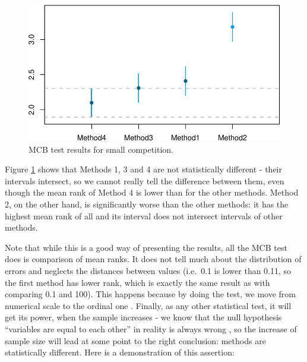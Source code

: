 \documentclass[
]{book}
\theoremstyle{definition}
\theoremstyle{definition}
\theoremstyle{definition}
\theoremstyle{definition}
\theoremstyle{remark}
\begin{document}
\begin{figure}
\centering
\includegraphics{adam_files/figure-latex/mcbForCompetition-1.pdf}
\caption{\label{fig:mcbForCompetition}MCB test results for small competition.}
\end{figure}

Figure \ref{fig:mcbForCompetition} shows that Methods 1, 3 and 4 are not statistically different - their intervals intersect, so we cannot really tell the difference between them, even though the mean rank of Method 4 is lower than for the other methods. Method 2, on the other hand, is significantly worse than the other methods: it has the highest mean rank of all and its interval does not intersect intervals of other methods.

Note that while this is a good way of presenting the results, all the MCB test does is comparison of mean ranks. It does not tell much about the distribution of errors and neglects the distances between values (i.e.~0.1 is lower than 0.11, so the first method has lower rank, which is exactly the same result as with comparing 0.1 and 100). This happens because by doing the test, we move from numerical scale to the ordinal one \citep[see Section 1.2 of][]{SvetunkovSBA}. Finally, as any other statistical test, it will get its power, when the sample increases - we know that the null hypothesis ``variables are equal to each other'' in reality is always wrong \citep[see Section 5.3 of][]{SvetunkovSBA}, so the increase of sample size will lead at some point to the right conclusion: methods are statistically different. Here is a demonstration of this assertion:
\end{document}
